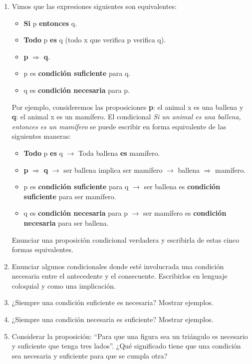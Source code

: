 \documentclass[12pt]{article}
\theoremstyle{definition}
\theoremstyle{remark}
\begin{document}
\begin{enumerate}
\item Vimos que las expresiones siguientes son equivalentes: 
\begin{itemize}
\setlength\itemsep{0em}
\item \textbf{Si} p \textbf{entonces} q.
\item \textbf{Todo} p \textbf{es} q (todo x que verifica p verifica q).
\item \textbf{p} $\Rightarrow$ \textbf{q}.
\item p es \textbf{condición suficiente} para q.
\item q es \textbf{condición necesaria} para p.
\end{itemize}
Por ejemplo, consideremos las proposiciones \textbf{p}: el animal x es una ballena y \textbf{q}: el animal x es un mamífero. El condicional  \textit{Si un animal  es una ballena, entonces es un mamífero} se puede escribir en forma equivalente de las siguientes maneras:
\begin{itemize}
\setlength\itemsep{0em}
\item \textbf{Todo} p \textbf{es} q $\rightarrow$ {Toda} ballena \textbf{es} mamífero.
\item \textbf{p} $\Rightarrow$ \textbf{q} $\rightarrow$  ser ballena implica ser mamífero $\rightarrow$  ballena $\Rightarrow$ mamífero.
\item p es \textbf{condición suficiente} para q $\rightarrow$  ser ballena es \textbf{condición suficiente} para ser mamífero.
\item q es \textbf{condición necesaria} para p $\rightarrow$  ser mamífero es \textbf{condición necesaria} para ser ballena.
\end{itemize}
Enunciar una proposición condicional verdadera y escribirla de estas cinco formas equivalentes.

\item  Enunciar algunos condicionales donde esté involucrada una condición necesaria entre el antecedente y el consecuente. Escribirlos en lenguaje coloquial y como una implicación.

\item ¿Siempre una condición suficiente es necesaria? Mostrar ejemplos.

\item ¿Siempre una condición necesaria es suficiente? Mostrar ejemplos.

\item Considerar la proposición: “Para que una figura sea un triángulo es necesario y suficiente que tenga tres lados”. ¿Qué significado tiene que una condición sea necesaria y suficiente para que se cumpla otra? 



\end{enumerate}
\end{document}
